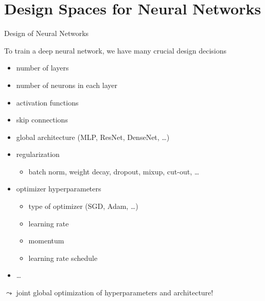 \section{Design Spaces for Neural Networks}
\begin{frame}[c]{Design of Neural Networks}

To train a deep neural network, we have many crucial design decisions \hands
\pause

\begin{itemize}
  \item number of layers
  \item number of neurons in each layer
  \item activation functions
  \item skip connections
  \item global architecture (MLP, ResNet, DenseNet, \ldots)
  \item regularization
  \begin{itemize}
    \item batch norm, weight decay, dropout, mixup, cut-out, \ldots 
  \end{itemize}
  \item optimizer hyperparameters
  \begin{itemize}
    \item type of optimizer (SGD, Adam, \ldots)
    \item learning rate
    \item momentum
    \item learning rate schedule
  \end{itemize}
  \item \ldots
\end{itemize}

$\leadsto$ joint global optimization of hyperparameters and architecture!

\end{frame}

